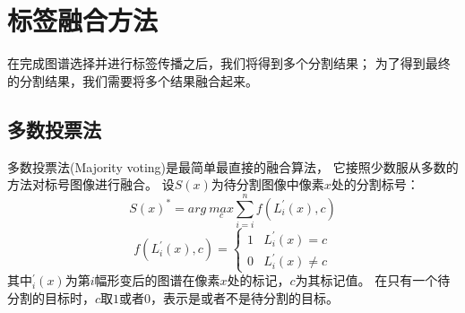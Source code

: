 \section{标签融合方法} %
在完成图谱选择并进行标签传播之后，我们将得到多个分割结果；
为了得到最终的分割结果，我们需要将多个结果融合起来。

\subsection{多数投票法}
%
%
%
多数投票法(Majority voting)是最简单最直接的融合算法，
它接照少数服从多数的方法对标号图像进行融合。
设$S(x)$为待分割图像中像素$x$处的分割标号：
\begin{equation}
  S(x)^\ast=arg\ \underset{c}{max}\sum_{i=i}^nf(L_i^\prime(x),c)
\end{equation}
\begin{equation}
  f(L_i^\prime(x),c)=
  \begin{cases}
    1& L_i^\prime(x)=c\\
    0& L_i^\prime(x)\ne c
  \end{cases}
\end{equation}
其中$_i^\prime(x)$为第$i$幅形变后的图谱在像素$x$处的标记，$c$为其标记值。
在只有一个待分割的目标时，$c$取$1$或者$0$，表示是或者不是待分割的目标。

